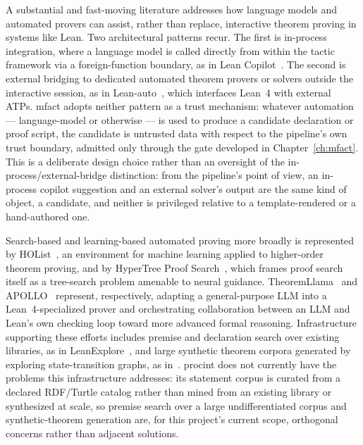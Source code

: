 A substantial and fast-moving literature addresses how language models
and automated provers can assist, rather than replace, interactive
theorem proving in systems like Lean. Two architectural patterns
recur. The first is in-process integration, where a language model is
called directly from within the tactic framework via a foreign-function
boundary, as in Lean Copilot~\cite{leancopilot2024}. The second is
external bridging to dedicated automated theorem provers or solvers
outside the interactive session, as in Lean-auto~\cite{leanauto2025},
which interfaces Lean~4 with external ATPs. \textsf{mfact} adopts neither
pattern as a trust mechanism: whatever automation --- language-model or
otherwise --- is used to produce a candidate declaration or proof
script, the candidate is untrusted data with respect to the pipeline's
own trust boundary, admitted only through the gate developed in
Chapter~\ref{ch:mfact}. This is a deliberate design choice rather than an
oversight of the in-process/external-bridge distinction: from the
pipeline's point of view, an in-process copilot suggestion and an
external solver's output are the same kind of object, a candidate, and
neither is privileged relative to a template-rendered or a
hand-authored one.

Search-based and learning-based automated proving more broadly is
represented by HOList~\cite{holist2019}, an environment for machine
learning applied to higher-order theorem proving, and by HyperTree Proof
Search~\cite{hypertree2022}, which frames proof search itself as a
tree-search problem amenable to neural guidance. TheoremLlama~\cite{theoremllama2024}
and APOLLO~\cite{apollo2025} represent, respectively, adapting a
general-purpose LLM into a Lean~4-specialized prover and orchestrating
collaboration between an LLM and Lean's own checking loop toward more
advanced formal reasoning. Infrastructure supporting these efforts
includes premise and declaration search over existing libraries, as in
LeanExplore~\cite{leanexplore2025}, and large synthetic theorem corpora
generated by exploring state-transition graphs, as
in~\cite{mathlib4dataset2025}. \textsf{procint} does not currently have
the problems this infrastructure addresses: its statement corpus is
curated from a declared RDF/Turtle catalog rather than mined from an
existing library or synthesized at scale, so premise search over a large
undifferentiated corpus and synthetic-theorem generation are, for this
project's current scope, orthogonal concerns rather than adjacent
solutions.

